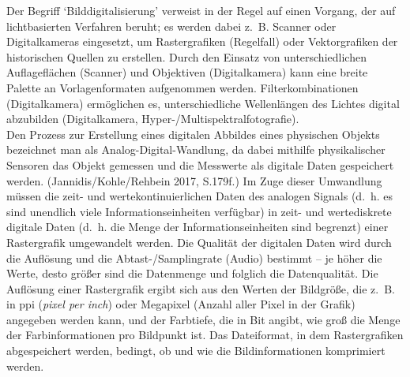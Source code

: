 \documentclass{article}
\begin{document}
    Der Begriff ‘Bilddigitalisierung’ verweist in der Regel auf einen Vorgang, der auf lichtbasierten Verfahren beruht; es werden dabei z. B. Scanner oder Digitalkameras eingesetzt, um Rastergrafiken (Regelfall) oder Vektorgrafiken der historischen Quellen zu erstellen. Durch den Einsatz von unterschiedlichen Auflageflächen (Scanner) und Objektiven (Digitalkamera) kann eine breite Palette an Vorlagenformaten aufgenommen werden. Filterkombinationen (Digitalkamera) ermöglichen es, unterschiedliche Wellenlängen des Lichtes digital abzubilden (Digitalkamera, Hyper-/Multispektralfotografie).\\
            
        Den Prozess zur Erstellung eines digitalen Abbildes eines physischen Objekts bezeichnet man als Analog-Digital-Wandlung, da dabei mithilfe physikalischer Sensoren das Objekt gemessen und die Messwerte als digitale Daten gespeichert werden. (Jannidis/Kohle/Rehbein 2017, S.179f.) Im Zuge dieser Umwandlung müssen die zeit- und wertekontinuierlichen Daten des analogen Signals (d. h. es sind unendlich viele Informationseinheiten verfügbar) in zeit- und wertediskrete digitale Daten (d. h. die Menge der Informationseinheiten sind begrenzt) einer Rastergrafik umgewandelt werden. Die Qualität der digitalen Daten wird durch die Auflösung und die Abtast-/Samplingrate (Audio) bestimmt – je höher die Werte, desto größer sind die Datenmenge und folglich die Datenqualität. Die Auflösung einer Rastergrafik ergibt sich aus den Werten der Bildgröße, die z. B. in ppi (\emph{pixel per inch}) oder Megapixel (Anzahl aller Pixel in der Grafik) angegeben werden kann, und der Farbtiefe, die in Bit angibt, wie groß die Menge der Farbinformationen pro Bildpunkt ist. Das Dateiformat, in dem Rastergrafiken abgespeichert werden, bedingt, ob und wie die Bildinformationen komprimiert werden.\\
            
\end{document}
